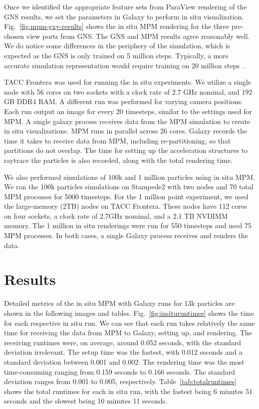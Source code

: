 \documentclass{vgtc}
\begin{document}
Once we identified the appropriate feature sets from ParaView rendering of the GNS results, we set the parameters in Galaxy to perform in situ visualization. Fig.~\ref{fig:mpm-gxy-results} shows the in situ MPM rendering for the three pre-chosen view ports from GNS. The GNS and MPM results agree reasonably well. We do notice some differences in the periphery of the simulation, which is expected as the GNS is only trained on 5 million steps. Typically, a more accurate simulation representation would require training on 20 million steps~\cite{sanchez2020learning}.

TACC Frontera \cite{stanzione20frontera} was used for running the in situ experiments. We utilize a single node with 56 cores on two sockets with a clock rate of 2.7 GHz nominal, and 192 GB DDR4 RAM.  A different run was performed for varying camera positions.  Each run output an image for every 20 timesteps, similar to the settings used for MPM.  A single galaxy process receives data from the MPM simulation to create in situ visualizations.  MPM runs in parallel across 26 cores.  Galaxy records the time it takes to receive data from MPM, including re-partitioning, so that partitions do not overlap.  The time for setting up the acceleration structures to raytrace the particles is also recorded, along with the total rendering time. 

We also performed simulations of 100k and 1 million particles using in situ MPM. We ran the 100k particles simulations on Stampede2 with two nodes and 70 total MPM processes for 5000 timesteps. For the 1 million point experiment, we used the large-memory (2TB) nodes on TACC Frontera. These nodes have 112 cores on four sockets, a clock rate of 2.7GHz nominal, and a 2.1 TB NVDIMM memory. The 1 million in situ renderings were run for 550 timesteps and used 75 MPM processes. In both cases, a single Galaxy process receives and renders the data. 

\section{Results}
\label{sec:results}

Detailed metrics of the in situ MPM with Galaxy runs for 13k particles are shown in the following images and tables. Fig.~\ref{fig:insituruntimes} shows the time for each respective in situ run. We can see that each run takes relatively the same time for receiving the data from MPM to Galaxy, setting up, and rendering. The receiving runtimes were, on average, around 0.052 seconds, with the standard deviation irrelevant. The setup time was the fastest, with 0.012 seconds and a standard deviation between 0.001 and 0.002. The rendering time was the most time-consuming ranging from 0.159 seconds to 0.166 seconds. The standard deviation ranges from 0.001 to 0.005, respectively. Table~\ref{tab:totalruntimes} shows the total runtimes for each in situ run, with the fastest being 6 minutes 51 seconds and the slowest being 10 minutes 11 seconds.
\end{document}
